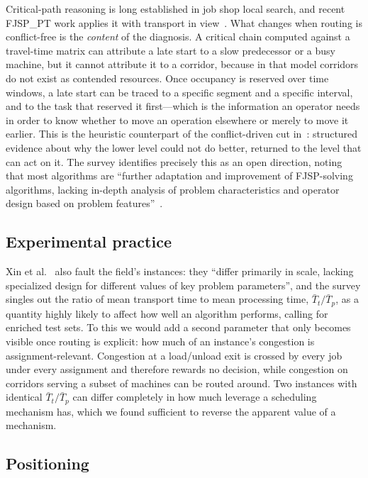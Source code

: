 \documentclass[manuscript,screen,review]{acmart}
\begin{document}
Critical-path reasoning is long established in job shop local search, and recent
FJSP\_PT work applies it with transport in view~\cite{qin2026knowledge}. What
changes when routing is conflict-free is the \emph{content} of the diagnosis. A
critical chain computed against a travel-time matrix can attribute a late start
to a slow predecessor or a busy machine, but it cannot attribute it to a corridor,
because in that model corridors do not exist as contended resources. Once
occupancy is reserved over time windows, a late start can be traced to a specific
segment and a specific interval, and to the task that reserved it first---which is
the information an operator needs in order to know whether to move an operation
elsewhere or merely to move it earlier. This is the heuristic counterpart of the
conflict-driven cut in~\cite{vanos2026exact}: structured evidence about why the
lower level could not do better, returned to the level that can act on it. The
survey identifies precisely this as an open direction, noting that most
algorithms are ``further adaptation and improvement of FJSP-solving algorithms,
lacking in-depth analysis of problem characteristics and operator design based on
problem features''~\cite{xin2025review}.

\subsection{Experimental practice}

Xin et al.~\cite{xin2025review} also fault the field's instances: they ``differ
primarily in scale, lacking specialized design for different values of key
problem parameters'', and the survey singles out the ratio of mean transport time
to mean processing time, $\bar{T}_t/\bar{T}_p$, as a quantity highly likely to
affect how well an algorithm performs, calling for enriched test sets. To this we
would add a second parameter that only becomes visible once routing is explicit:
how much of an instance's congestion is assignment-relevant. Congestion at a
load/unload exit is crossed by every job under every assignment and therefore
rewards no decision, while congestion on corridors serving a subset of machines
can be routed around. Two instances with identical $\bar{T}_t/\bar{T}_p$ can
differ completely in how much leverage a scheduling mechanism has, which we found
sufficient to reverse the apparent value of a mechanism.

\subsection{Positioning}
\end{document}
